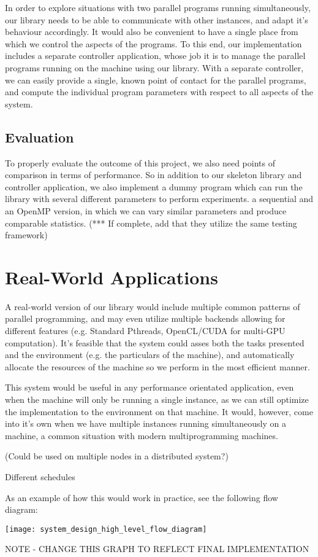 In order to explore situations with two parallel programs running simultaneously, our library needs to be able to communicate with other instances, and adapt it's behaviour accordingly. It would also be convenient to have a single place from which we control the aspects of the programs. To this end, our implementation includes a separate controller application, whose job it is to manage the parallel programs running on the machine using our library. With a separate controller, we can easily provide a single, known point of contact for the parallel programs, and compute the individual program parameters with respect to all aspects of the system.





\subsection{Evaluation}

To properly evaluate the outcome of this project, we also need points of comparison in terms of performance. So in addition to our skeleton library and controller application, we also implement a dummy program which can run the library with several different parameters to perform experiments. a sequential and an OpenMP version, in which we can vary similar parameters and produce comparable statistics. (*** If complete, add that they utilize the same testing framework)



\section{Real-World Applications}

A real-world version of our library would include multiple common patterns of parallel programming, and may even utilize multiple backends allowing for different features (e.g. Standard Pthreads, OpenCL/CUDA for multi-GPU computation). It's feasible that the system could asses both the tasks presented and the environment (e.g. the particulars of the machine), and automatically allocate the resources of the machine so we perform in the most efficient manner.

This system would be useful in any performance orientated application, even when the machine will only be running a single instance, as we can still optimize the implementation to the environment on that machine. It would, however, come into it's own when we have multiple instances running simultaneously on a machine, a common situation with modern multiprogramming machines.

(Could be used on multiple nodes in a distributed system?)

Different schedules

As an example of how this would work in practice, see the following flow diagram:

\begin{center}
\vspace{0.5cm}
\texttt{[image: system\_design\_high\_level\_flow\_diagram]}
\end{center}

NOTE - CHANGE THIS GRAPH TO REFLECT FINAL IMPLEMENTATION